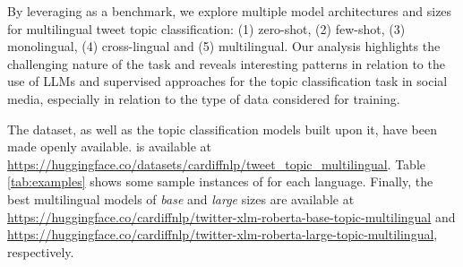 By leveraging {\XTOPIC} as a benchmark, we explore multiple model architectures and sizes for multilingual tweet topic classification: 
(1) zero-shot, (2) few-shot, (3) monolingual, (4) cross-lingual and (5) multilingual. Our analysis highlights the challenging nature of the task and reveals interesting patterns in relation to the use of \acp{LLM} and supervised approaches for the topic classification task in social media, especially in relation to the type of data considered for training. 

The {\XTOPIC} dataset, as well as the topic classification models built upon it, have been made openly available. {\XTOPIC} is available at \url{https://huggingface.co/datasets/cardiffnlp/tweet_topic_multilingual}. Table \ref{tab:examples} shows some sample instances of {\XTOPIC} for each language. Finally, the best multilingual models of \textit{base} and \textit{large} sizes are available at \url{https://huggingface.co/cardiffnlp/twitter-xlm-roberta-base-topic-multilingual} and \url{https://huggingface.co/cardiffnlp/twitter-xlm-roberta-large-topic-multilingual}, respectively.



